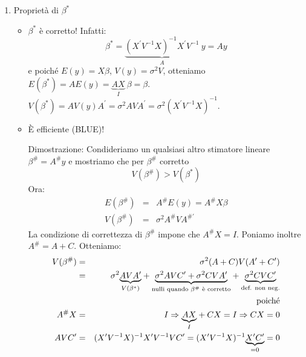 \documentclass[a4paper]{report}
\newcounter{def}
\theoremstyle{remark}
\begin{document}
\begin{enumerate}
\item Propriet\`{a} di $\beta ^{\ast }$

\begin{itemize}
\item $\beta ^{\ast }$ \`{e} corretto! Infatti: 
\begin{equation*}
\beta ^{\ast }=\underset{A}{\underbrace{(X^{\prime }V^{-1}X)^{-1}X^{\prime
}V^{-1}}}\ y=Ay
\end{equation*}%
e poich\'{e} $E(y)=X\beta $, $V(y)=\sigma ^{2}V$, otteniamo $E(\beta ^{\ast
})=AE(y)=\underset{I}{\underbrace{AX}}\ \beta =\beta .$\newline
$V(\beta ^{\ast })=AV(y)A^{\prime }=\sigma ^{2}AVA^{\prime }=\sigma
^{2}(X^{\prime }V^{-1}X)^{-1}$.

\item \`{E} efficiente (BLUE)!

Dimostrazione: Condideriamo un qualsiasi altro stimatore lineare $\beta
^{\#}=A^{\#}y$ e mostriamo che per $\beta ^{\#}$ corretto 
\begin{equation*}
V(\beta ^{\#})>V(\beta ^{\ast })
\end{equation*}%
Ora: 
\begin{eqnarray*}
E(\beta ^{\#}) &=&A^{\#}E(y)=A^{\#}X\beta \\
V(\beta ^{\#}) &=&\sigma ^{2}A^{\#}V{A^{\#\prime }}
\end{eqnarray*}%
La condizione di correttezza di $\beta ^{\#}$ impone che $A^{\#}X=I$.
Poniamo inoltre $A^{\#}=A+C$. Otteniamo: 
\begin{eqnarray*}
V(\beta ^{\#}) &=&\sigma ^{2}(A+C)V(A^{\prime }+C^{\prime }) \\
&=&\sigma ^{2}\underset{V(\beta ^{\ast })}{\underbrace{AVA^{\prime }}}+%
\underset{\text{nulli quando }\beta ^{\#}\text{ \`{e} corretto}}{\underbrace{%
\sigma ^{2}AVC^{\prime }+\sigma ^{2}CVA^{\prime }}}+\underset{\text{def. non
neg.}}{\underbrace{\sigma ^{2}CVC^{\prime }}} \\
&&\text{poich\'{e}} \\
A^{\#}X &=&I\Rightarrow \underset{I}{\underbrace{AX}}+CX=I\Rightarrow CX=0 \\
AVC^{\prime } &=&(X^{\prime }V^{-1}X)^{-1}X^{\prime }V^{-1}VC^{\prime
}=(X^{\prime }V^{-1}X)^{-1}\underset{=0}{\underbrace{X^{\prime }C^{\prime }}}%
=0
\end{eqnarray*}
\end{itemize}


\end{enumerate}
\end{document}
